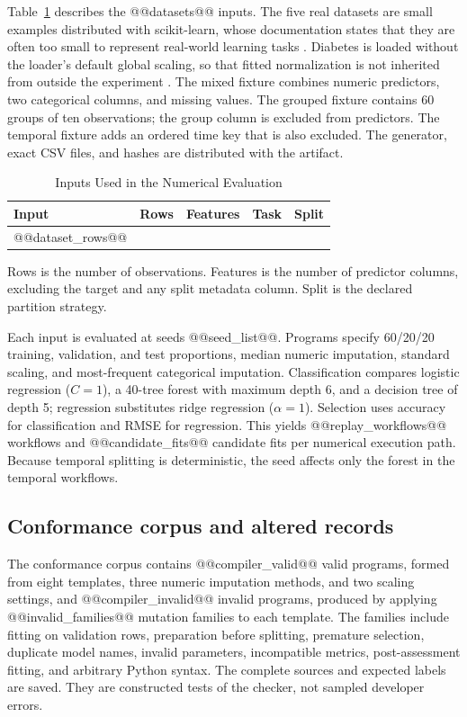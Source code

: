 \documentclass[lettersize,journal]{IEEEtran}
\begin{document}
Table~\ref{tab:data} describes the @@datasets@@ inputs. The five real datasets are small examples distributed with scikit-learn, whose documentation states that they are often too small to represent real-world learning tasks \cite{sklearndata}. Diabetes is loaded without the loader's default global scaling, so that fitted normalization is not inherited from outside the experiment \cite{sklearndiabetes}. The mixed fixture combines numeric predictors, two categorical columns, and missing values. The grouped fixture contains 60 groups of ten observations; the group column is excluded from predictors. The temporal fixture adds an ordered time key that is also excluded. The generator, exact CSV files, and hashes are distributed with the artifact.

\begin{table}[t]
\caption{Inputs Used in the Numerical Evaluation}
\label{tab:data}\centering\footnotesize
\begin{tabular}{lrrll}\toprule
Input & Rows & Features & Task & Split\\\midrule
@@dataset_rows@@
\bottomrule
\end{tabular}

\smallskip
\parbox{0.95\columnwidth}{\footnotesize Rows is the number of observations. Features is the number of predictor columns, excluding the target and any split metadata column. Split is the declared partition strategy.}
\end{table}

Each input is evaluated at seeds @@seed_list@@. Programs specify 60/20/20 training, validation, and test proportions, median numeric imputation, standard scaling, and most-frequent categorical imputation. Classification compares logistic regression ($C=1$), a 40-tree forest with maximum depth 6, and a decision tree of depth 5; regression substitutes ridge regression ($\alpha=1$). Selection uses accuracy for classification and RMSE for regression. This yields @@replay_workflows@@ workflows and @@candidate_fits@@ candidate fits per numerical execution path. Because temporal splitting is deterministic, the seed affects only the forest in the temporal workflows.

\subsection{Conformance corpus and altered records}
The conformance corpus contains @@compiler_valid@@ valid programs, formed from eight templates, three numeric imputation methods, and two scaling settings, and @@compiler_invalid@@ invalid programs, produced by applying @@invalid_families@@ mutation families to each template. The families include fitting on validation rows, preparation before splitting, premature selection, duplicate model names, invalid parameters, incompatible metrics, post-assessment fitting, and arbitrary Python syntax. The complete sources and expected labels are saved. They are constructed tests of the checker, not sampled developer errors.
\end{document}
